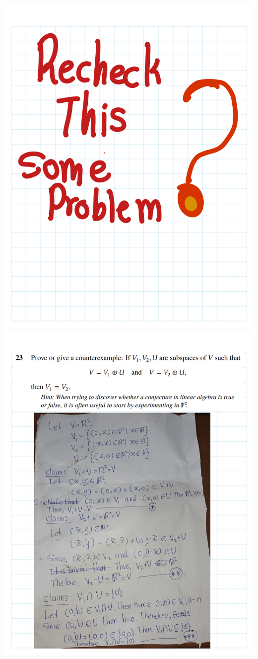 \documentclass[
]{book}
\theoremstyle{definition}
\theoremstyle{definition}
\theoremstyle{definition}
\theoremstyle{definition}
\theoremstyle{remark}
\begin{document}
\begin{enumerate}
  \includegraphics{fig/Ex1C/Ex/Ex-28.png} \includegraphics{fig/Ex1C/Ex/Ex-29.png}

\end{enumerate}
\end{document}
